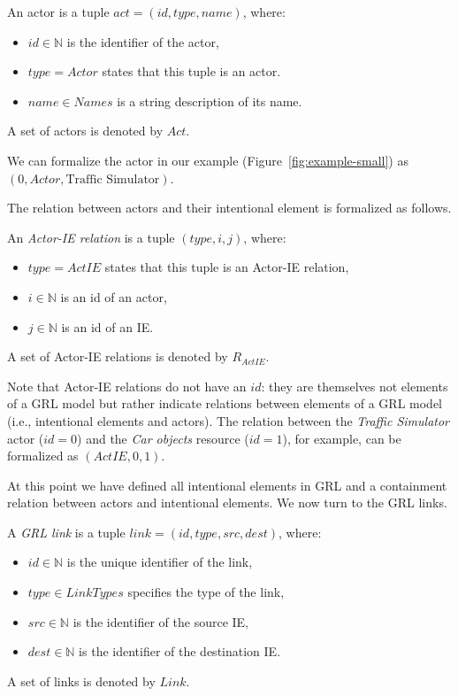 \begin{definition}[Actor]
\label{def:actor}
An actor is a tuple $act=(id,type, name)$, where:
\begin{itemize}
\item $id\in\mathbb{N}$ is the identifier of the actor, 
\item $type = Actor$ states that this tuple is an actor.
\item $name\in Names$ is a string description of its name.
\end{itemize}
A set of actors is denoted by $Act$.
\end{definition}
We can formalize the actor in our example (Figure~\ref{fig:example-small}) as $(0,Actor,\text{Traffic Simulator})$.%

The relation between actors and their intentional element is formalized as follows. 

\begin{definition}
\label{def:act-ie-relation}
An \emph{Actor-IE relation} is a tuple $(type, i, j)$, where:
\begin{itemize}
\item $type = ActIE$ states that this tuple is an Actor-IE relation,
\item $i\in\mathbb{N}$ is an id of an actor,
\item $j\in\mathbb{N}$ is an id of an IE.
\end{itemize}

A set of Actor-IE relations is denoted by $R_{ActIE}$.
\end{definition}

Note that Actor-IE relations do not have an $id$: they are themselves not elements of a GRL model but rather indicate relations between elements of a GRL model (i.e., intentional elements and actors). The relation between the \emph{Traffic Simulator} actor ($id = 0$) and the \emph{Car objects} resource ($id=1$), for example, can be formalized as $(ActIE, 0, 1)$.

At this point we have defined all intentional elements in GRL and a containment relation between actors and intentional elements. We now turn to the GRL links.

\begin{definition}
\label{def:link}
A \emph{GRL link} is a tuple $link = (id,type,src,dest)$, where:
\begin{itemize}
\item $id\in \mathbb{N}$ is the unique identifier of the link,
\item $type\in LinkTypes$ specifies the type of the link, 
\item $src\in \mathbb{N}$ is the identifier of the source IE,
\item $dest\in \mathbb{N}$ is the identifier of the destination IE.
\end{itemize}

A set of links is denoted by $Link$.
\end{definition}

